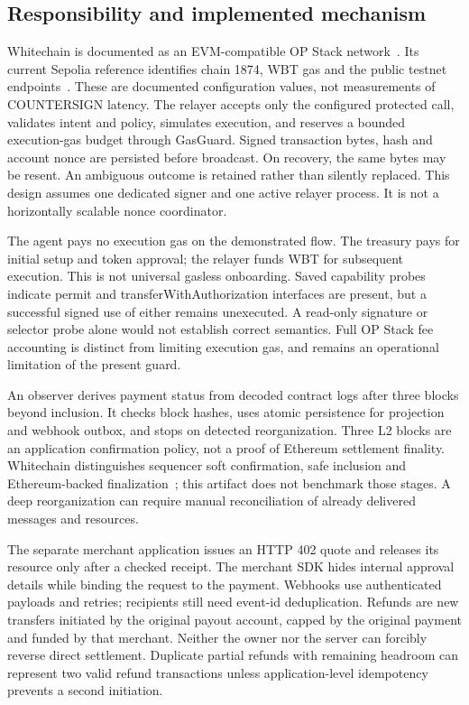 \documentclass[11pt]{article}
\begin{document}
\subsection{Responsibility and implemented mechanism}
Whitechain is documented as an EVM-compatible OP Stack network~\cite{whitechain}. Its current Sepolia reference identifies chain 1874, WBT gas and the public testnet endpoints~\cite{whitechainnetwork}. These are documented configuration values, not measurements of COUNTERSIGN latency. The relayer accepts only the configured protected call, validates intent and policy, simulates execution, and reserves a bounded execution-gas budget through GasGuard. Signed transaction bytes, hash and account nonce are persisted before broadcast. On recovery, the same bytes may be resent. An ambiguous outcome is retained rather than silently replaced. This design assumes one dedicated signer and one active relayer process. It is not a horizontally scalable nonce coordinator.

The agent pays no execution gas on the demonstrated flow. The treasury pays for initial setup and token approval; the relayer funds WBT for subsequent execution. This is not universal gasless onboarding. Saved capability probes indicate permit and transferWithAuthorization interfaces are present, but a successful signed use of either remains unexecuted. A read-only signature or selector probe alone would not establish correct semantics. Full OP Stack fee accounting is distinct from limiting execution gas, and remains an operational limitation of the present guard.

An observer derives payment status from decoded contract logs after three blocks beyond inclusion. It checks block hashes, uses atomic persistence for projection and webhook outbox, and stops on detected reorganization. Three L2 blocks are an application confirmation policy, not a proof of Ethereum settlement finality. Whitechain distinguishes sequencer soft confirmation, safe inclusion and Ethereum-backed finalization~\cite{whitechainfinality}; this artifact does not benchmark those stages. A deep reorganization can require manual reconciliation of already delivered messages and resources.

The separate merchant application issues an HTTP 402 quote and releases its resource only after a checked receipt. The merchant SDK hides internal approval details while binding the request to the payment. Webhooks use authenticated payloads and retries; recipients still need event-id deduplication. Refunds are new transfers initiated by the original payout account, capped by the original payment and funded by that merchant. Neither the owner nor the server can forcibly reverse direct settlement. Duplicate partial refunds with remaining headroom can represent two valid refund transactions unless application-level idempotency prevents a second initiation.
\end{document}
